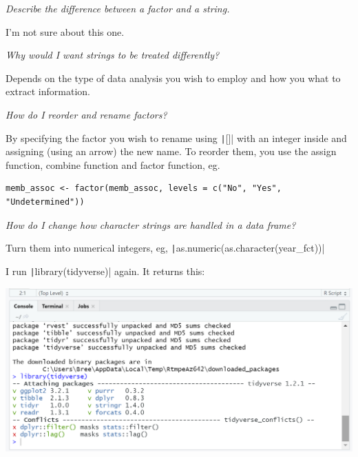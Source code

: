 \documentclass{article}
\begin{document}
\textit{Describe the difference between a factor and a string.}

I'm not sure about this one.

\textit{Why would I want strings to be treated differently?}

Depends on the type of data analysis you wish to employ and how you what to extract information.

\textit{How do I reorder and rename factors?}

By specifying the factor you wish to rename using \texttt|[]| with an integer inside and assigning (using an arrow) the new name. To reorder them, you use the assign function, combine function and factor function, eg.

\begin{verbatim}
memb_assoc <- factor(memb_assoc, levels = c("No", "Yes", "Undetermined"))
\end{verbatim}

\textit{How do I change how character strings are handled in a data frame?}

Turn them into numerical integers, eg, \texttt|as.numeric(as.character(year\_fct))|


I run \texttt|library(tidyverse)| again. It returns this:

\includegraphics[width=1.0\textwidth]{rstudio_14.PNG}
\end{document}
